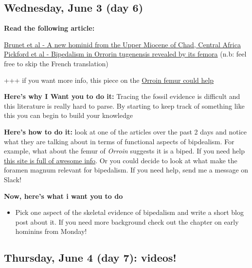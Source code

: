 \documentclass[]{tufte-handout}
\providecommand{\tightlist}{%
  \setlength{\itemsep}{0pt}\setlength{\parskip}{0pt}}
\begin{document}
\hypertarget{wednesday-june-3-day-6}{%
\subsection{Wednesday, June 3 (day 6)}\label{wednesday-june-3-day-6}}

\textbf{Read the following article:}

\href{http://planet.botany.uwc.ac.za/nisl/research_methods/scientific_methods/pdf/chad_hominids.pdf}{Brunet
et al - A new hominid from the Upper Miocene of Chad, Central Africa}
\href{https://www.sciencedirect.com/science/article/pii/S1631068302000283}{Pickford
et al - Bipedalism in Orrorin tugenensis revealed by its femora} (n.b:
feel free to skip the French translation)

+++ if you want more info, this piece on the
\href{https://cashp.columbian.gwu.edu/sites/g/files/zaxdzs1746/f/downloads/2008-Richmond-Jungers.pdf}{Orroin
femur could help}

\begin{marginfigure}
\textbf{Here's why I Want you to do it:} Tracing the fossil evidence is
difficult and this literature is really hard to parse. By starting to
keep track of something like this you can begin to build your knowledge

\textbf{Here's how to do it:} look at one of the articles over the past
2 days and notice what they are talking about in terms of functional
aspects of bipdealism. For example, what about the femur of
\emph{Orroin} suggests it is a biped. If you need help
\href{https://humanorigins.si.edu/human-characteristics/walking-upright}{this
site is full of awesome info}. Or you could decide to look at what make
the foramen magnum relevant for bipedalism. If you need help, send me a
message on Slack!
\end{marginfigure}

\textbf{Now, here's what i want you to do}

\begin{itemize}
\tightlist
\item
  Pick one aspect of the skeletal evidence of bipedalism and write a
  short blog post about it. If you need more background check out the
  chapter on early hominins from Monday!
\end{itemize}

\hypertarget{thursday-june-4-day-7-videos}{%
\subsection{Thursday, June 4 (day 7):
videos!}\label{thursday-june-4-day-7-videos}}
\end{document}
